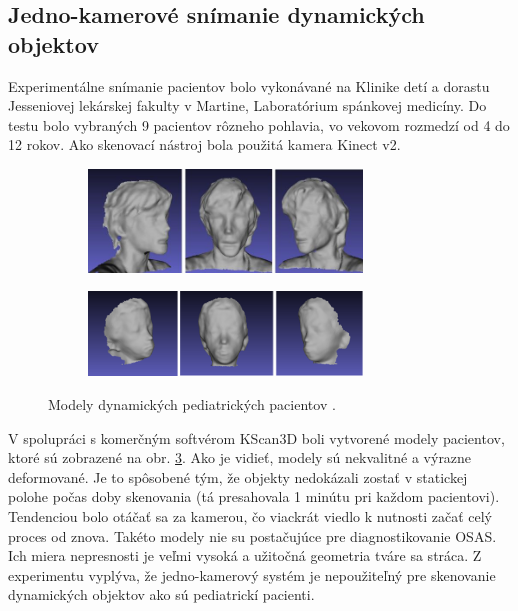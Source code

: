 \subsection{Jedno-kamerové snímanie dynamických objektov}

Experimentálne snímanie pacientov bolo vykonávané na Klinike detí a dorastu Jesseniovej lekárskej fakulty v Martine, Laboratórium spánkovej medicíny. Do testu bolo vybraných 9 pacientov rôzneho pohlavia, vo vekovom rozmedzí od 4 do 12 rokov. Ako skenovací nástroj bola použitá kamera Kinect v2.

\begin{figure}[h]
	\centering
	\begin{subfigure}[b]{\textwidth}
		\centering
		\includegraphics[width=0.8\textwidth]{figures/dynamic_patient_a.png}
		\label{fig:dynamic_patient:a}
	\end{subfigure}
	\vskip 8pt 
	\begin{subfigure}[b]{\textwidth}
		\centering
		\includegraphics[width=0.8\textwidth]{figures/dynamic_patient_b.png}
		\label{fig:dynamic_patient:b}
	\end{subfigure}
	\caption{Modely dynamických pediatrických pacientov \cite{sekelova}.}
	\label{fig:dynamic_patient}
\end{figure}

V spolupráci s komerčným softvérom KScan3D boli vytvorené modely pacientov, ktoré sú zobrazené na obr. \ref{fig:dynamic_patient}. Ako je vidieť, modely sú nekvalitné a výrazne deformované. Je to spôsobené tým, že objekty nedokázali zostať v statickej polohe počas doby skenovania (tá presahovala 1 minútu pri každom pacientovi). Tendenciou bolo otáčať sa za kamerou, čo viackrát viedlo k nutnosti začať celý proces od znova. Takéto modely nie su postačujúce pre diagnostikovanie OSAS. Ich miera nepresnosti je veľmi vysoká a užitočná geometria tváre sa stráca. Z experimentu vyplýva, že jedno-kamerový systém je nepoužiteľný pre skenovanie dynamických objektov ako sú pediatrickí pacienti.  

